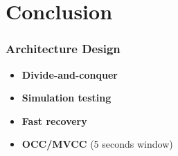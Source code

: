 \section{Conclusion}

\begin{frame}
    \frametitle{Architecture Design}
    \begin{itemize}
        \item \textbf{Divide-and-conquer}
        \item \textbf{Simulation testing}
        \item \textbf{Fast recovery}
        \item \textbf{OCC/MVCC} (5 seconds window)
    \end{itemize}
\end{frame}
